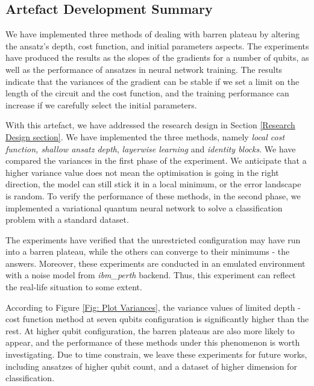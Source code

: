 \subsection{Artefact Development Summary}

We have implemented three methods of dealing with barren plateau by altering the ansatz's depth, cost function, and initial parameters aspects.
The experiments have produced the results as the slopes of the gradients for a number of qubits, as well as the performance of ansatzes in neural network training.
The results indicate that the variances of the gradient can be stable if we set a limit on the length of the circuit and the cost function, and the training performance can increase if we carefully select the initial parameters.

With this artefact, we have addressed the research design in Section \ref{Research Design section}.
We have implemented the three methods, namely \textit{local cost function, shallow ansatz depth}, \textit{layerwise learning} and \textit{identity blocks}.
We have compared the variances in the first phase of the experiment.
We anticipate that a higher variance value does not mean the optimisation is going in the right direction, the model can still stick it in a local minimum, or the error landscape is random.
To verify the performance of these methods, in the second phase, we implemented a variational quantum neural network to solve a classification problem with a standard dataset.

The experiments have verified that the unrestricted configuration may have run into a barren plateau, while the others can converge to their minimums - the answers.
Moreover, these experiments are conducted in an emulated environment with a noise model from \emph{ibm\_perth} backend.
Thus, this experiment can reflect the real-life situation to some extent.

According to Figure \ref{Fig: Plot Variances}, the variance values of limited depth - cost function method at seven qubits configuration is significantly higher than the rest.
At higher qubit configuration, the barren plateaus are also more likely to appear, and the performance of these methods under this phenomenon is worth investigating.
Due to time constrain, we leave these experiments for future works, including ansatzes of higher qubit count, and a dataset of higher dimension for classification.
